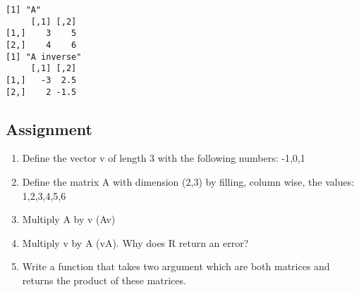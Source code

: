     \begin{Verbatim}[commandchars=\\\{\}]
[1] "A"
     [,1] [,2]
[1,]    3    5
[2,]    4    6
[1] "A inverse"
     [,1] [,2]
[1,]   -3  2.5
[2,]    2 -1.5
    \end{Verbatim}

    \hypertarget{assignment}{%
\subsection{Assignment}\label{assignment}}

\begin{enumerate}
\def\labelenumi{\arabic{enumi}.}
\tightlist
\item
  Define the vector v of length 3 with the following numbers: -1,0,1
\item
  Define the matrix A with dimension (2,3) by filling, column wise, the
  values: 1,2,3,4,5,6
\item
  Multiply A by v (Av)
\item
  Multiply v by A (vA). Why does R return an error?
\item
  Write a function that takes two argument which are both matrices and
  returns the product of these matrices.
\end{enumerate}

